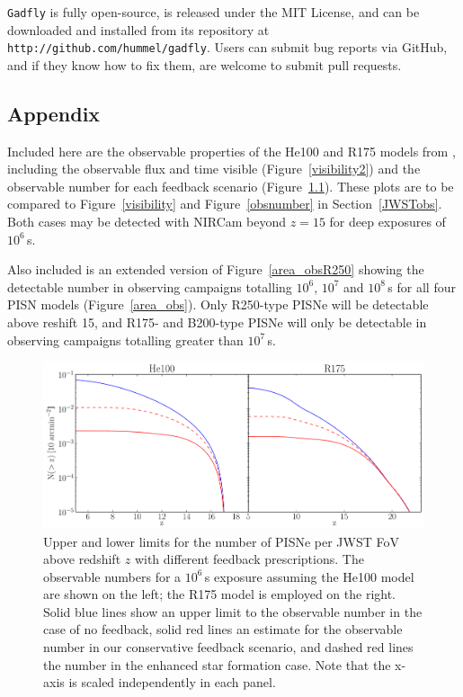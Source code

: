 \documentclass{thesis}
\newcommand{\code}[1]{\texttt{#1}}
\newcommand{\RefFig}[1]{\mbox{Figure~\ref{#1}}}
\newcommand{\RefSec}[1]{\mbox{Section~\ref{#1}}}
\begin{document}
\code{Gadfly} is fully open-source, is released under the MIT License, and can be downloaded and installed from its repository at \code{http://github.com/hummel/gadfly}.  Users can submit bug reports via GitHub, and if they know how to fix them, are welcome to submit pull requests.


\begin{appendix}
\chapter{Appendix}
\label{appendix}
Included here are the observable properties of the He100 and R175 models from
\citet{KasenWoosleyHeger2011}, including the observable flux and time visible 
(\RefFig{visibility2}) and the observable number for each feedback scenario 
(\RefFig{obsnumber2}).  These plots are to be compared to
\RefFig{visibility} and \RefFig{obsnumber} in \RefSec{JWSTobs}.  Both
cases may be detected with NIRCam beyond $z=15$ for deep exposures of
$10^6\,$s.

Also included is an extended version of \RefFig{area_obsR250} showing
the detectable number in observing campaigns totalling $10^6$, $10^7$
and $10^8\,$s for all four PISN models (\RefFig{area_obs}). Only
R250-type PISNe will be detectable above reshift 15, and R175- and
B200-type PISNe will only be detectable in observing campaigns
totalling greater than $10^7\,$s.

\begin{figure}
 \begin{center}
   \includegraphics[width=\columnwidth]{observableNumber2}
   \caption{Upper and lower limits for the number of
     PISNe per JWST FoV above redshift $z$ with different feedback
     prescriptions. The observable numbers for a $10^6\,$s exposure
     assuming the He100 model are shown on the left; the R175 model is
     employed on the right. Solid blue lines show an upper limit
     to the observable number in the case of no feedback, solid red
     lines an estimate for the observable number in our conservative
     feedback scenario, and dashed red lines the number in the
     enhanced star formation case. Note that the x-axis is scaled
     independently in each panel.  }
   \label{obsnumber2}
 \end{center}
\end{figure} 


\end{appendix}
\end{document}
